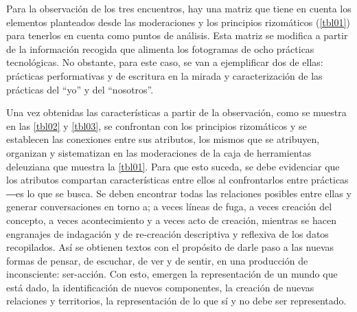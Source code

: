 \documentclass[spanish]{textolivre}
\begin{document}
Para la observación de los tres encuentros, hay una matriz que tiene en cuenta los elementos planteados desde las moderaciones y los principios rizomáticos (\cref{tbl01}) para tenerlos en cuenta como puntos de análisis. Esta matriz se modifica a partir de la información recogida que alimenta los fotogramas de ocho prácticas tecnológicas. No obstante, para este caso, se van a ejemplificar dos de ellas: prácticas performativas y de escritura en la mirada y caracterización de las prácticas del “yo” y del “nosotros”.

Una vez obtenidas las características a partir de la observación, como se muestra en las \cref{tbl02} y \cref{tbl03}, se confrontan con los principios rizomáticos y se establecen las conexiones entre sus atributos, los mismos que se atribuyen, organizan y sistematizan en las moderaciones de la caja de herramientas deleuziana que muestra la \cref{tbl01}. Para que esto suceda, se debe evidenciar que los atributos compartan características entre ellos al confrontarlos entre prácticas ―es lo que se busca. Se deben encontrar todas las relaciones posibles entre ellas y generar conversaciones en torno a; a veces líneas de fuga, a veces creación del concepto, a veces acontecimiento y a veces acto de creación, mientras se hacen engranajes de indagación y de re-creación descriptiva y reflexiva de los datos recopilados. Así se obtienen textos con el propósito de darle paso a las nuevas formas de pensar, de escuchar, de ver y de sentir, en una producción de inconsciente: ser-acción. Con esto, emergen la representación de un mundo que está dado, la identificación de nuevos componentes, la creación de nuevas relaciones y territorios, la representación de lo que sí y no debe ser representado.
\end{document}
